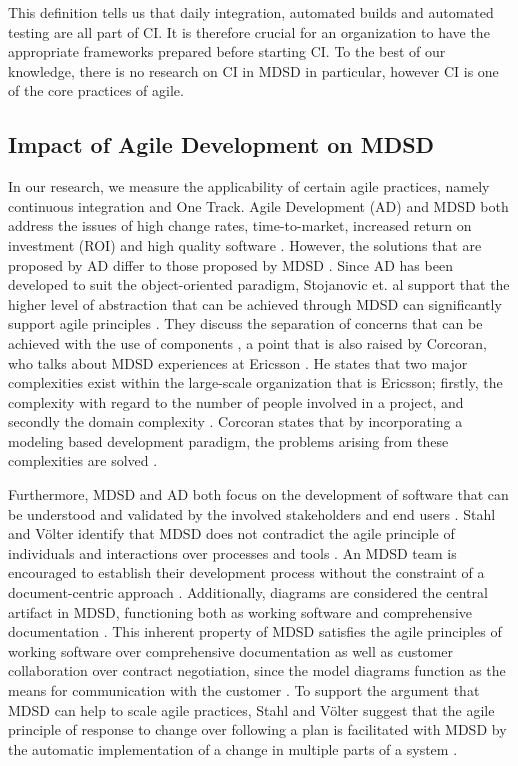 \documentclass[fina_report_innit.tex]{subfiles}
\begin{document}
This definition tells us that daily integration, automated builds and automated testing are all part of CI. It is therefore crucial for an organization to have the appropriate frameworks prepared before starting CI. To the best of our knowledge, there is no research on CI in MDSD in particular, however CI is one of the core practices of agile.

\subsection{Impact of Agile Development on MDSD}

In our research, we measure the applicability of certain agile practices, namely continuous integration and One Track. Agile Development (AD) and MDSD both address the issues of high change rates, time-to-market, increased return on investment (ROI) and high quality software \cite{stojanovic2003component}. However, the solutions that are proposed by AD differ to those proposed by MDSD \cite{stojanovic2003component}. Since AD has been developed to suit the object-oriented paradigm, Stojanovic et. al support that the higher level of abstraction that can be achieved through MDSD can significantly support agile principles \cite{stojanovic2003component}. They discuss the separation of concerns that can be achieved with the use of components \cite{stojanovic2003component}, a point that is also raised by Corcoran, who talks about MDSD experiences at Ericsson \cite{selic2010modelling}. He states that two major complexities exist within the large-scale organization that is Ericsson; firstly, the complexity with regard to the number of people involved in a project, and secondly the domain complexity \cite{selic2010modelling}. Corcoran states that by incorporating a modeling based development paradigm, the problems arising from these complexities are solved \cite{selic2010modelling}. 

Furthermore, MDSD and AD both focus on the development of software that can be understood and validated by the involved stakeholders and end users \cite{stahl2006model}. Stahl and Völter identify that MDSD does not contradict the agile principle of individuals and interactions over processes and tools \cite{stahl2006model}. An MDSD team is encouraged to establish their development process without the constraint of a document-centric approach \cite{stahl2006model}. Additionally, diagrams are considered the central artifact in MDSD, functioning both as working software and comprehensive documentation \cite{stahl2006model}. This inherent property of MDSD satisfies the agile principles of working software over comprehensive documentation as well as customer collaboration over contract negotiation, since the model diagrams function as the means for communication with the customer \cite{stahl2006model}. To support the argument that MDSD can help to scale agile practices, Stahl and Völter suggest that the agile principle of response to change over following a plan is facilitated with MDSD by the automatic implementation of a change in multiple parts of a system \cite{stahl2006model}.
\end{document}
